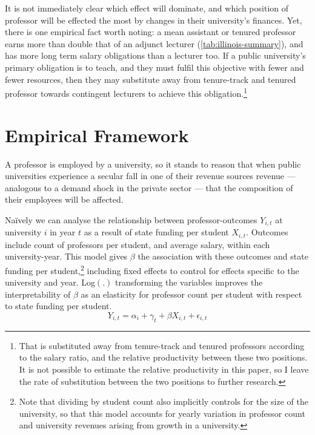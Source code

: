 \documentclass[notitlepage,12pt]{article}
\begin{document}
It is not immediately clear which effect will dominate, and which position of professor will be effected the most by changes in their university's finances.
Yet, there is one empirical fact worth noting: a mean assistant or tenured professor earns more than double that of an adjunct lecturer (\autoref{tab:illinois-summary}), and has more long term salary obligations than a lecturer too.
If a public university's primary obligation is to teach, and they must fulfil this objective with fewer and fewer resources, then they may substitute away from tenure-track and tenured professor towards contingent lecturers to achieve this obligation.\footnote{
    That is substituted away from tenure-track and tenured professors according to the salary ratio, and the relative productivity between these two positions.
    It is not possible to estimate the relative productivity in this paper, so I leave the rate of substitution between the two positions to further research.
}


\section{Empirical Framework}
\label{sec:empirics}

A professor is employed by a university, so it stands to reason that when public universities experience a secular fall in one of their revenue sources revenue --- analogous to a demand shock in the private sector --- that the composition of their employees will be affected.

Na\"ively we can analyse the relationship between professor-outcomes $Y_{i,t}$ at university $i$ in year $t$ as a result of state funding per student $X_{i,t}$.
Outcomes include count of professors per student, and average salary, within each university-year.
This model gives $\beta$ the association with these outcomes and state funding per student,\footnote{
    Note that dividing by student count also implicitly controls for the size of the university, so that this model accounts for yearly variation in professor count and university revenues arising from growth in a university.
}
including fixed effects to control for effects specific to the university and year.
Log$(.)$ transforming the variables improves the interpretability of $\beta$ as an elasticity for professor count per student with respect to state funding per student.
\begin{equation}
    \label{eqn:naivereg}
    Y_{i,t} = \alpha_i + \gamma_t + \beta X_{i,t} + \epsilon_{i,t}
\end{equation}
\end{document}
